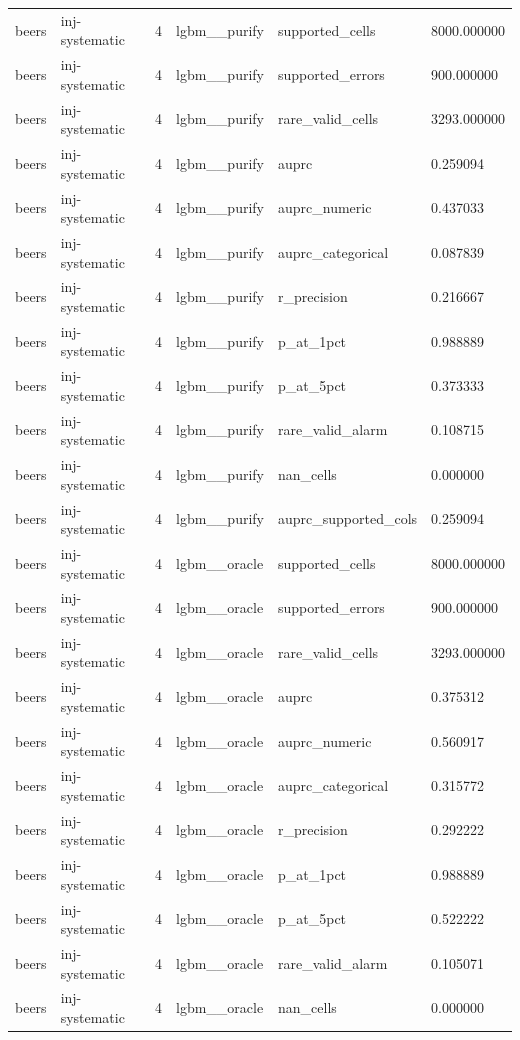 \begin{tabular}{llllll}
beers & inj-systematic & 4 & lgbm\_\_purify & supported\_cells & 8000.000000 \\
beers & inj-systematic & 4 & lgbm\_\_purify & supported\_errors & 900.000000 \\
beers & inj-systematic & 4 & lgbm\_\_purify & rare\_valid\_cells & 3293.000000 \\
beers & inj-systematic & 4 & lgbm\_\_purify & auprc & 0.259094 \\
beers & inj-systematic & 4 & lgbm\_\_purify & auprc\_numeric & 0.437033 \\
beers & inj-systematic & 4 & lgbm\_\_purify & auprc\_categorical & 0.087839 \\
beers & inj-systematic & 4 & lgbm\_\_purify & r\_precision & 0.216667 \\
beers & inj-systematic & 4 & lgbm\_\_purify & p\_at\_1pct & 0.988889 \\
beers & inj-systematic & 4 & lgbm\_\_purify & p\_at\_5pct & 0.373333 \\
beers & inj-systematic & 4 & lgbm\_\_purify & rare\_valid\_alarm & 0.108715 \\
beers & inj-systematic & 4 & lgbm\_\_purify & nan\_cells & 0.000000 \\
beers & inj-systematic & 4 & lgbm\_\_purify & auprc\_supported\_cols & 0.259094 \\
beers & inj-systematic & 4 & lgbm\_\_oracle & supported\_cells & 8000.000000 \\
beers & inj-systematic & 4 & lgbm\_\_oracle & supported\_errors & 900.000000 \\
beers & inj-systematic & 4 & lgbm\_\_oracle & rare\_valid\_cells & 3293.000000 \\
beers & inj-systematic & 4 & lgbm\_\_oracle & auprc & 0.375312 \\
beers & inj-systematic & 4 & lgbm\_\_oracle & auprc\_numeric & 0.560917 \\
beers & inj-systematic & 4 & lgbm\_\_oracle & auprc\_categorical & 0.315772 \\
beers & inj-systematic & 4 & lgbm\_\_oracle & r\_precision & 0.292222 \\
beers & inj-systematic & 4 & lgbm\_\_oracle & p\_at\_1pct & 0.988889 \\
beers & inj-systematic & 4 & lgbm\_\_oracle & p\_at\_5pct & 0.522222 \\
beers & inj-systematic & 4 & lgbm\_\_oracle & rare\_valid\_alarm & 0.105071 \\
beers & inj-systematic & 4 & lgbm\_\_oracle & nan\_cells & 0.000000 \\

\end{tabular}
